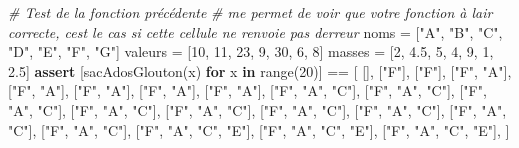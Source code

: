 \documentclass[
  paper=a4,
  ,captions=tableheading
]{scrartcl}
\newenvironment{Shaded}{}{}
\newcommand{\BuiltInTok}[1]{\textcolor[rgb]{0.00,0.50,0.00}{#1}}
\newcommand{\CommentTok}[1]{\textcolor[rgb]{0.38,0.63,0.69}{\textit{#1}}}
\newcommand{\ControlFlowTok}[1]{\textcolor[rgb]{0.00,0.44,0.13}{\textbf{#1}}}
\newcommand{\DecValTok}[1]{\textcolor[rgb]{0.25,0.63,0.44}{#1}}
\newcommand{\FloatTok}[1]{\textcolor[rgb]{0.25,0.63,0.44}{#1}}
\newcommand{\KeywordTok}[1]{\textcolor[rgb]{0.00,0.44,0.13}{\textbf{#1}}}
\newcommand{\NormalTok}[1]{#1}
\newcommand{\OperatorTok}[1]{\textcolor[rgb]{0.40,0.40,0.40}{#1}}
\newcommand{\StringTok}[1]{\textcolor[rgb]{0.25,0.44,0.63}{#1}}
\begin{document}
\begin{Shaded}
\begin{Highlighting}[]
\CommentTok{\# Test de la fonction précédente}
\CommentTok{\# me permet de voir que votre fonction à l\textquotesingle{}air correcte, c\textquotesingle{}est le cas si cette cellule ne renvoie pas d\textquotesingle{}erreur}
\NormalTok{noms }\OperatorTok{=}\NormalTok{ [}\StringTok{"A"}\NormalTok{, }\StringTok{"B"}\NormalTok{, }\StringTok{"C"}\NormalTok{, }\StringTok{"D"}\NormalTok{, }\StringTok{"E"}\NormalTok{, }\StringTok{"F"}\NormalTok{, }\StringTok{"G"}\NormalTok{]}
\NormalTok{valeurs }\OperatorTok{=}\NormalTok{ [}\DecValTok{10}\NormalTok{, }\DecValTok{11}\NormalTok{, }\DecValTok{23}\NormalTok{, }\DecValTok{9}\NormalTok{, }\DecValTok{30}\NormalTok{, }\DecValTok{6}\NormalTok{, }\DecValTok{8}\NormalTok{]}
\NormalTok{masses }\OperatorTok{=}\NormalTok{ [}\DecValTok{2}\NormalTok{, }\FloatTok{4.5}\NormalTok{, }\DecValTok{5}\NormalTok{, }\DecValTok{4}\NormalTok{, }\DecValTok{9}\NormalTok{, }\DecValTok{1}\NormalTok{, }\FloatTok{2.5}\NormalTok{]}
\ControlFlowTok{assert}\NormalTok{ [sacAdosGlouton(x) }\ControlFlowTok{for}\NormalTok{ x }\KeywordTok{in} \BuiltInTok{range}\NormalTok{(}\DecValTok{20}\NormalTok{)] }\OperatorTok{==}\NormalTok{ [}
\NormalTok{    [],}
\NormalTok{    [}\StringTok{"F"}\NormalTok{],}
\NormalTok{    [}\StringTok{"F"}\NormalTok{],}
\NormalTok{    [}\StringTok{"F"}\NormalTok{, }\StringTok{"A"}\NormalTok{],}
\NormalTok{    [}\StringTok{"F"}\NormalTok{, }\StringTok{"A"}\NormalTok{],}
\NormalTok{    [}\StringTok{"F"}\NormalTok{, }\StringTok{"A"}\NormalTok{],}
\NormalTok{    [}\StringTok{"F"}\NormalTok{, }\StringTok{"A"}\NormalTok{],}
\NormalTok{    [}\StringTok{"F"}\NormalTok{, }\StringTok{"A"}\NormalTok{],}
\NormalTok{    [}\StringTok{"F"}\NormalTok{, }\StringTok{"A"}\NormalTok{, }\StringTok{"C"}\NormalTok{],}
\NormalTok{    [}\StringTok{"F"}\NormalTok{, }\StringTok{"A"}\NormalTok{, }\StringTok{"C"}\NormalTok{],}
\NormalTok{    [}\StringTok{"F"}\NormalTok{, }\StringTok{"A"}\NormalTok{, }\StringTok{"C"}\NormalTok{],}
\NormalTok{    [}\StringTok{"F"}\NormalTok{, }\StringTok{"A"}\NormalTok{, }\StringTok{"C"}\NormalTok{],}
\NormalTok{    [}\StringTok{"F"}\NormalTok{, }\StringTok{"A"}\NormalTok{, }\StringTok{"C"}\NormalTok{],}
\NormalTok{    [}\StringTok{"F"}\NormalTok{, }\StringTok{"A"}\NormalTok{, }\StringTok{"C"}\NormalTok{],}
\NormalTok{    [}\StringTok{"F"}\NormalTok{, }\StringTok{"A"}\NormalTok{, }\StringTok{"C"}\NormalTok{],}
\NormalTok{    [}\StringTok{"F"}\NormalTok{, }\StringTok{"A"}\NormalTok{, }\StringTok{"C"}\NormalTok{],}
\NormalTok{    [}\StringTok{"F"}\NormalTok{, }\StringTok{"A"}\NormalTok{, }\StringTok{"C"}\NormalTok{],}
\NormalTok{    [}\StringTok{"F"}\NormalTok{, }\StringTok{"A"}\NormalTok{, }\StringTok{"C"}\NormalTok{, }\StringTok{"E"}\NormalTok{],}
\NormalTok{    [}\StringTok{"F"}\NormalTok{, }\StringTok{"A"}\NormalTok{, }\StringTok{"C"}\NormalTok{, }\StringTok{"E"}\NormalTok{],}
\NormalTok{    [}\StringTok{"F"}\NormalTok{, }\StringTok{"A"}\NormalTok{, }\StringTok{"C"}\NormalTok{, }\StringTok{"E"}\NormalTok{],}
\NormalTok{]}
\end{Highlighting}
\end{Shaded}
\end{document}
